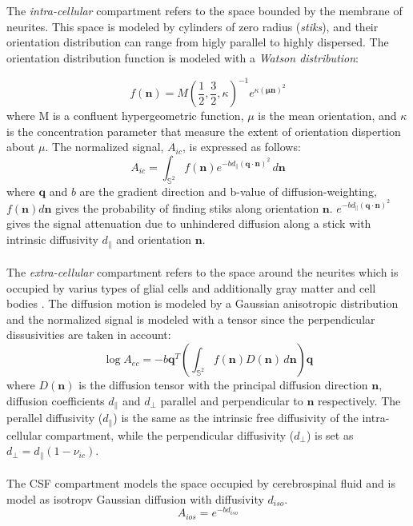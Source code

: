  \\\\
 The \emph{intra-cellular} compartment refers to the space bounded by the membrane of neurites. This space is modeled by cylinders of zero radius (\emph{stiks}), and their orientation distribution can range from higly parallel to highly dispersed. The orientation distribution function is modeled with a \emph{Watson distribution}:

 \begin{equation}
   f(\mathbf{n}) = M(\frac{1}{2},\frac{3}{2},\kappa)^{-1}e^{\kappa(\mathbf{ \mu n})^2}
 \end{equation}
 where M is a confluent hypergeometric function, $\mu$ is the mean orientation, and $\kappa$ is the concentration parameter that measure the extent of orientation dispertion about $\mu$.
 The normalized signal, $A_{ic}$, is expressed as follows:
 \begin{equation}
   A_{ic} = \int_{\mathbb{S}^2} f(\mathbf{n})e^{-bd_{\parallel}(\mathbf{q\cdot n})^2} \,d\mathbf{n}
 \end{equation}
 where $\mathbf{q}$ and $b$ are the gradient direction and b-value of diffusion-weighting, $f(\mathbf{n})d\mathbf{n}$ gives the probability of finding stiks along orientation $\mathbf{n}$. $e^{-bd_{\parallel}(\mathbf{q\cdot n})^2}$ gives the signal attenuation due to unhindered diffusion along a stick with intrinsic diffusivity $d_{\parallel}$ and orientation $\mathbf{n}$.
 \\\\
 The \emph{extra-cellular} compartment refers to the space around the neurites which is occupied by varius types of glial cells and additionally gray matter and cell bodies \cite{zhang2012noddi}. The diffusion motion is modeled by a Gaussian anisotropic distribution and the normalized signal is modeled with a tensor since the perpendicular dissusivities are taken in account:
 \begin{equation}
   \log A_{ec} = -b\mathbf{q}^T(\int_{\mathbb{S}^2} f(\mathbf{n})D(\mathbf{n})\,d\mathbf{n})\mathbf{q}
 \end{equation}
 where $D(\mathbf{n})$ is the diffusion tensor with the principal diffusion direction $\mathbf{n}$, diffusion coefficients $d_{\parallel}$ and $d_{\perp}$ parallel and perpendicular to $\mathbf{n}$ respectively. The perallel diffusivity ($d_{\parallel}$) is the same as the intrinsic free diffusivity of the intra-cellular compartment, while the perpendicular diffusivity ($d_{\perp}$) is set as $d_{\perp} = d_{\parallel}(1-\nu_{ic})$.
 \\\\
 The CSF compartment models the space occupied by cerebrospinal fluid and is model as isotropv Gaussian diffusion with diffusivity $d_{iso}$.
 \begin{equation}
   A_{ios} = e^{-b d_{iso}}
 \end{equation}
